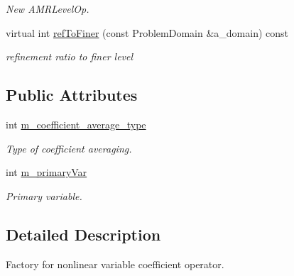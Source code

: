 \begin{DoxyCompactItemize}
\begin{DoxyCompactList}\small\item\em New A\-M\-R\-Level\-Op. \end{DoxyCompactList}\item 
\hypertarget{class_a_m_r_non_linear_v_c_op_factory_a929447da52aa5465086bcf126e237f8f}{virtual int \hyperlink{class_a_m_r_non_linear_v_c_op_factory_a929447da52aa5465086bcf126e237f8f}{ref\-To\-Finer} (const Problem\-Domain \&a\-\_\-domain) const }\label{class_a_m_r_non_linear_v_c_op_factory_a929447da52aa5465086bcf126e237f8f}

\begin{DoxyCompactList}\small\item\em refinement ratio to finer level \end{DoxyCompactList}\end{DoxyCompactItemize}
\subsection*{Public Attributes}
\begin{DoxyCompactItemize}
\item 
\hypertarget{class_a_m_r_non_linear_v_c_op_factory_a9411c57c3f625542f956d23a455fff89}{int \hyperlink{class_a_m_r_non_linear_v_c_op_factory_a9411c57c3f625542f956d23a455fff89}{m\-\_\-coefficient\-\_\-average\-\_\-type}}\label{class_a_m_r_non_linear_v_c_op_factory_a9411c57c3f625542f956d23a455fff89}

\begin{DoxyCompactList}\small\item\em Type of coefficient averaging. \end{DoxyCompactList}\item 
\hypertarget{class_a_m_r_non_linear_v_c_op_factory_a9b08a0600c20a6fe1d35da72dd65e87d}{int \hyperlink{class_a_m_r_non_linear_v_c_op_factory_a9b08a0600c20a6fe1d35da72dd65e87d}{m\-\_\-primary\-Var}}\label{class_a_m_r_non_linear_v_c_op_factory_a9b08a0600c20a6fe1d35da72dd65e87d}

\begin{DoxyCompactList}\small\item\em Primary variable. \end{DoxyCompactList}\end{DoxyCompactItemize}


\subsection{Detailed Description}
Factory for nonlinear variable coefficient operator. 

